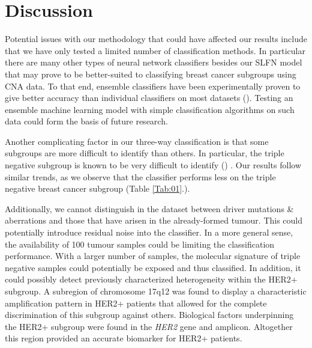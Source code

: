 \section{Discussion}


    Potential issues with our methodology that could have affected our results include that we have only tested a limited number of classification methods. In particular there are many other types of neural network classifiers besides our SLFN model that may prove to be better-suited to classifying breast cancer subgroups using CNA data. To that end, ensemble classifiers have been experimentally proven to give better accuracy than individual classifiers on most datasets (\citealp{hsieh2012}). Testing an ensemble machine learning model with simple classification algorithms on such data could form the basis of future research. 
    
            
    Another complicating factor in our three-way classification is that some subgroups are more difficult to identify than others.  In particular, the triple negative subgroup is known to be very difficult to identify (\citealp{Bianchini2016}) . Our results follow similar trends, as we observe that the classifier performs less on the triple negative breast cancer subgroup (Table \ref{Tab:01}.). 
            
    Additionally, we cannot distinguish in the dataset between driver mutations \& aberrations and those that have arisen in the already-formed tumour. This could potentially introduce residual noise into the classifier. In a more general sense, the availability of 100 tumour samples could be limiting the classification performance. With a larger number of samples, the molecular signature of triple negative samples could potentially be exposed and thus classified. In addition, it could possibly detect previously characterized heterogeneity within the HER2+ subgroup.
    A subregion of chromosome 17q12 was found to display a characteristic amplification pattern in HER2+ patients that allowed for the complete discrimination of this subgroup against others. Biological factors underpinning the HER2+ subgroup were found in the \textit{HER2} gene and amplicon. Altogether this region provided an accurate biomarker for HER2+ patients.
    
